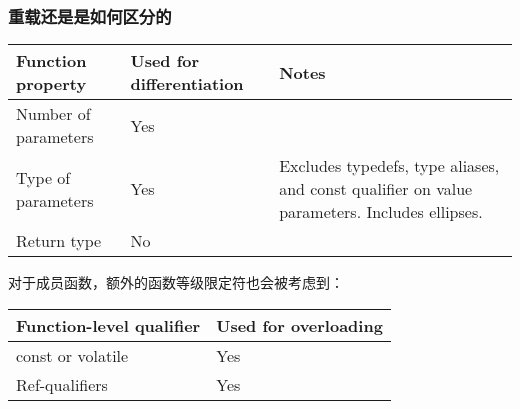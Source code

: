 \documentclass[../../LearnCpp.tex]{subfiles}
\begin{document}

\subsubsection*{重载还是是如何区分的}

\begin{center}
    \begin{tiny}
        \begin{tabularx}{ 1\textwidth}{
                | >{\raggedright\arraybackslash}X
                | >{\raggedright\arraybackslash}X
                | >{\raggedright\arraybackslash}X |
            }
            \hline
            Function property    & Used for differentiation & Notes                                                                                        \\
            \hline
            Number of parameters & Yes                      &                                                                                              \\
            Type of parameters   & Yes                      & Excludes typedefs, type aliases, and const qualifier on value parameters. Includes ellipses. \\
            Return type          & No                       &                                                                                              \\
            \hline
        \end{tabularx}
    \end{tiny}
\end{center}

对于成员函数，额外的函数等级限定符也会被考虑到：

\begin{center}
    \begin{tiny}
        \begin{tabularx}{ 1\textwidth}{
                | >{\raggedright\arraybackslash}X
                | >{\raggedright\arraybackslash}X |
            }
            \hline
            Function-level qualifier & Used for overloading \\
            \hline
            const or volatile        & Yes                  \\
            Ref-qualifiers           & Yes                  \\
            \hline
        \end{tabularx}
    \end{tiny}
\end{center}
\end{document}
